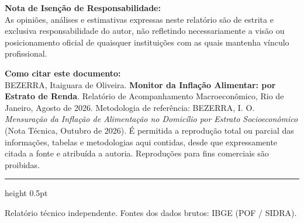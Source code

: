 \documentclass[10pt,a4paper]{article}
\begin{document}
	\vspace{0.10cm}
	
	\begin{tcolorbox}[notabox]
		{\bfseries \color{bisnavy} Nota de Isenção de Responsabilidade:}\\[2pt]
		{\footnotesize \color{secondary} As opiniões, análises e estimativas expressas neste relatório são de estrita e exclusiva responsabilidade do autor, não refletindo necessariamente a visão ou posicionamento oficial de quaisquer instituições com as quais mantenha vínculo profissional.}
	\end{tcolorbox}
	
	\vspace{0.08cm}
	
	\begin{tcolorbox}[notabox]
		{\bfseries \color{bisnavy} Como citar este documento:}\\[2pt]
		{\footnotesize \color{secondary} BEZERRA, Itaiguara de Oliveira. \textbf{Monitor da Inflação Alimentar: por Estrato de Renda}. Relatório de Acompanhamento Macroeconômico, Rio de Janeiro, Agosto de 2026. Metodologia de referência: BEZERRA, I. O. \textit{Mensuração da Inflação de Alimentação no Domicílio por Estrato Socioeconômico} (Nota Técnica, Outubro de 2026). É permitida a reprodução total ou parcial das informações, tabelas e metodologias aqui contidas, desde que expressamente citada a fonte e atribuída a autoria. Reproduções para fins comerciais são proibidas.}
	\end{tcolorbox}
	
	\vspace{0.10cm}
	{\color{rulecolor}\hrule height 0.5pt}
	\vspace{2pt}
	{\tiny \color{secondary} Relatório técnico independente. Fontes dos dados brutos: IBGE (POF / SIDRA).}
	
\end{document}
